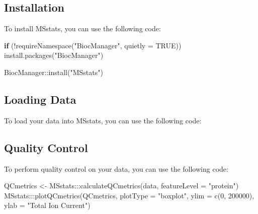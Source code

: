 \documentclass[
]{book}
\newenvironment{Shaded}{\begin{snugshade}}{\end{snugshade}}
\newcommand{\AttributeTok}[1]{\textcolor[rgb]{0.77,0.63,0.00}{#1}}
\newcommand{\ConstantTok}[1]{\textcolor[rgb]{0.00,0.00,0.00}{#1}}
\newcommand{\ControlFlowTok}[1]{\textcolor[rgb]{0.13,0.29,0.53}{\textbf{#1}}}
\newcommand{\DecValTok}[1]{\textcolor[rgb]{0.00,0.00,0.81}{#1}}
\newcommand{\FunctionTok}[1]{\textcolor[rgb]{0.00,0.00,0.00}{#1}}
\newcommand{\NormalTok}[1]{#1}
\newcommand{\OtherTok}[1]{\textcolor[rgb]{0.56,0.35,0.01}{#1}}
\newcommand{\SpecialCharTok}[1]{\textcolor[rgb]{0.00,0.00,0.00}{#1}}
\newcommand{\StringTok}[1]{\textcolor[rgb]{0.31,0.60,0.02}{#1}}
\begin{document}
\hypertarget{installation-1}{%
\subsection{Installation}\label{installation-1}}

To install MSstats, you can use the following code:

\begin{Shaded}
\begin{Highlighting}[]
\ControlFlowTok{if}\NormalTok{ (}\SpecialCharTok{!}\FunctionTok{requireNamespace}\NormalTok{(}\StringTok{"BiocManager"}\NormalTok{, }\AttributeTok{quietly =} \ConstantTok{TRUE}\NormalTok{))}
    \FunctionTok{install.packages}\NormalTok{(}\StringTok{"BiocManager"}\NormalTok{)}

\NormalTok{BiocManager}\SpecialCharTok{::}\FunctionTok{install}\NormalTok{(}\StringTok{"MSstats"}\NormalTok{)}
\end{Highlighting}
\end{Shaded}

\hypertarget{loading-data}{%
\subsection{Loading Data}\label{loading-data}}

To load your data into MSstats, you can use the following code:

\begin{Shaded}
\end{Shaded}

\hypertarget{quality-control}{%
\subsection{Quality Control}\label{quality-control}}

To perform quality control on your data, you can use the following code:

\begin{Shaded}
\begin{Highlighting}[]
\NormalTok{QCmetrics }\OtherTok{\textless{}{-}}\NormalTok{ MSstats}\SpecialCharTok{:::}\FunctionTok{calculateQCmetrics}\NormalTok{(data, }\AttributeTok{featureLevel =} \StringTok{"protein"}\NormalTok{)}
\NormalTok{MSstats}\SpecialCharTok{:::}\FunctionTok{plotQCmetrics}\NormalTok{(QCmetrics, }\AttributeTok{plotType =} \StringTok{"boxplot"}\NormalTok{,}
                        \AttributeTok{ylim =} \FunctionTok{c}\NormalTok{(}\DecValTok{0}\NormalTok{, }\DecValTok{200000}\NormalTok{), }\AttributeTok{ylab =} \StringTok{"Total Ion Current"}\NormalTok{)}
\end{Highlighting}
\end{Shaded}
\end{document}
